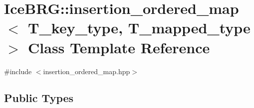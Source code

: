 \hypertarget{classIceBRG_1_1insertion__ordered__map}{}\section{Ice\+B\+R\+G\+:\+:insertion\+\_\+ordered\+\_\+map$<$ T\+\_\+key\+\_\+type, T\+\_\+mapped\+\_\+type $>$ Class Template Reference}
\label{classIceBRG_1_1insertion__ordered__map}


{\ttfamily \#include $<$insertion\+\_\+ordered\+\_\+map.\+hpp$>$}

\subsection*{Public Types}
